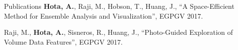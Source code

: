 \documentclass{resume} %
\begin{document}
\begin{multicols}{2}
\begin{rSection}{Publications}
  \textbf{Hota, A.}, Raji, M., Hobson, T., Huang, J., ``A Space-Efficient Method for Ensemble Analysis and Visualization'', EGPGV 2017. \href{http://web.eecs.utk.edu/~ahota/pdfs/nea-egpgv-2017.pdf}{\faFilePdfO}

  Raji, M., \textbf{Hota, A.}, Sisneros, R., Huang, J., ``Photo-Guided Exploration of Volume Data Features'', EGPGV 2017. \href{http://web.eecs.utk.edu/~ahota/pdfs/photoguided-egpgv-2017.pdf}{\faFilePdfO}
\end{rSection}

\end{multicols}

\end{document}
